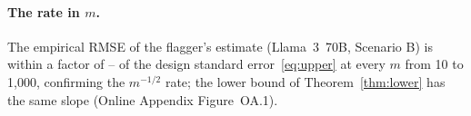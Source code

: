 \paragraph{The rate in $m$.} The empirical RMSE of the flagger's estimate (Llama~3~70B, Scenario B) is within a factor of \rateRatioMin--\rateRatioMax{} of the design standard error~\eqref{eq:upper} at every $m$ from 10 to 1{,}000, confirming the $m^{-1/2}$ rate; the lower bound of Theorem~\ref{thm:lower} has the same slope (Online Appendix Figure~OA.1).
